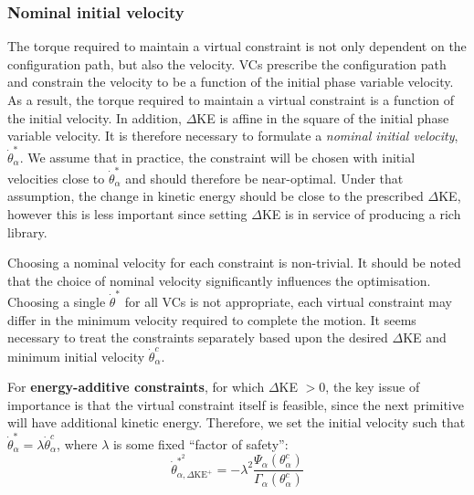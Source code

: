 \subsubsection{Nominal initial velocity}
The torque required to maintain a virtual constraint is not only dependent on the configuration path, but also the velocity. VCs prescribe the configuration path and constrain the velocity to be a function of the initial phase variable velocity. As a result, the torque required to maintain a virtual constraint is a function of the initial velocity. In addition, $\Delta$KE is affine in the square of the initial phase variable velocity. It is therefore necessary to formulate a \textit{nominal initial velocity}, $\dot{\theta}_\alpha^*$. We assume that in practice, the constraint will be chosen with initial velocities close to $\dot{\theta}_\alpha^*$ and should therefore be near-optimal. Under that assumption, the change in kinetic energy should be close to the prescribed $\Delta$KE, however this is less important since setting $\Delta$KE is in service of producing a rich library.

Choosing a nominal velocity for each constraint is non-trivial. It should be noted that the choice of nominal velocity significantly influences the optimisation. Choosing a single $\dot{\theta}^*$ for all VCs is not appropriate, each virtual constraint may differ in the minimum velocity required to complete the motion. It seems necessary to treat the constraints separately based upon the desired $\Delta$KE and minimum initial velocity $\dot{\theta}^c_\alpha$.

For \textbf{energy-additive constraints}, for which $\Delta$KE $>0$, the key issue of importance is that the virtual constraint itself is feasible, since the next primitive will have additional kinetic energy. Therefore, we set the initial velocity such that $\dot{\theta}_\alpha^* = \lambda\dot{\theta}_\alpha^c$, where $\lambda$ is some fixed ``factor of safety'':
\begin{equation} \label{eqn:energyadditive}
\dot{\theta}_{\alpha,\Delta\mathrm{KE}^+}^{*^2} = -\lambda^2\frac{ \Psi_\alpha(\theta_\alpha^c)}{ \Gamma_\alpha(\theta_\alpha^c)}
\end{equation}

